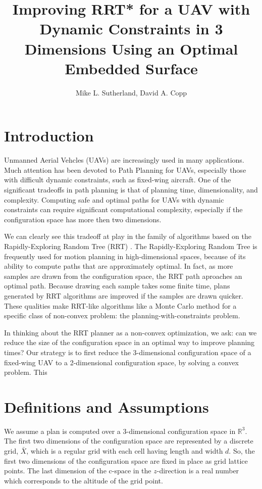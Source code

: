 \documentclass[letterpaper, 12pt]{article}
\title{Improving RRT* for a UAV with Dynamic Constraints in 3 Dimensions Using an Optimal Embedded Surface}
\author{Mike L. Sutherland, David A. Copp}
\begin{document}
\maketitle

\section{Introduction}
Unmanned Aerial Vehcles (UAVs) are increasingly used in many applications. Much attention has been devoted to Path Planning for UAVs, especially those with difficult dynamic constraints, such as fixed-wing aircraft. One of the significant tradeoffs in path planning is that of planning time, dimensionality, and complexity. Computing safe and optimal paths for UAVs with dynamic constraints can require significant computational complexity, especially if the configuration space has more then two dimensions.

We can clearly see this tradeoff at play in the family of algorithms based on the Rapidly-Exploring Random Tree (RRT) \cite{lavalle2006}. The Rapidly-Exploring Random Tree is frequently used for motion planning in high-dimensional spaces, because of its ability to compute paths that are approximately optimal. In fact, as more samples are drawn from the configuration space, the RRT path aproaches an optimal path. Because drawing each sample takes some finite time, plans generated by RRT algorithms are improved if the samples are drawn quicker. These qualities make RRT-like algorithms like a Monte Carlo method for a specific class of non-convex problem: the planning-with-constraints problem.

In thinking about the RRT planner as a non-convex optimization, we ask: can we reduce the size of the configuration space in an optimal way to improve planning times? 
Our strategy is to first reduce the 3-dimensional configuration space of a fixed-wing UAV to a 2-dimensional configuration space, by solving a convex problem. This 


\section{Definitions and Assumptions}
We assume a plan is computed over a 3-dimensional configuration space in $\mathbb{R}^3$. The first two dimensions of the configuration space are represented by a discrete grid, $\bar{X}$, which is a regular grid with each cell having length and width $d$. So, the first two dimensions of the configuration space are fixed in place as grid lattice points. The last dimension of the c-space in the $z$-direction is a real number which corresponds to the altitude of the grid point.
\end{document}
